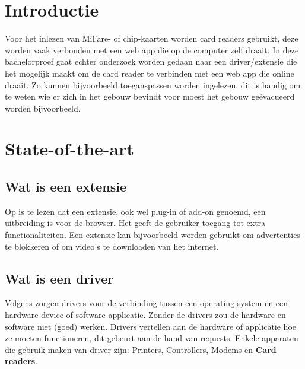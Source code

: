 \documentclass{hogent-article}
\affiliation{
  \textsuperscript{1} \href{mailto:wout.demaeseneer@student.hogent.be}{mailto:wout.demaeseneer@student.hogent.be}}
\begin{document}
\flushbottom %
\maketitle %
\tableofcontents %
\thispagestyle{empty} %


\section{Introductie}
Voor het inlezen van MiFare- of chip-kaarten worden card readers gebruikt, deze worden vaak verbonden met een web app die op de computer zelf draait. In deze bachelorproef gaat echter onderzoek worden gedaan naar een driver/extensie die het mogelijk maakt om de card reader te verbinden met een web app die online draait. Zo kunnen bijvoorbeeld toeganspassen worden ingelezen, dit is handig om te weten wie er zich in het gebouw bevindt voor moest het gebouw geëvacueerd worden bijvoorbeeld.

\section{State-of-the-art}

\subsection{Wat is een extensie}
Op \textcite{Seniorweb} is te lezen dat een extensie, ook wel plug-in of add-on genoemd, een uitbreiding is voor de browser. Het geeft de gebruiker toegang tot extra functionaliteiten. Een extensie kan bijvoorbeeld worden gebruikt om advertenties te blokkeren of om video's te downloaden van het internet.

\subsection{Wat is een driver}
Volgens \textcite{Webopedia} zorgen drivers voor de verbinding tussen een operating system en een hardware device of software applicatie. Zonder de drivers zou de hardware en software niet (goed) werken. Drivers vertellen aan de hardware of applicatie hoe ze moeten functioneren, dit gebeurt aan de hand van requests. Enkele apparaten die gebruik maken van driver zijn: Printers, Controllers, Modems en \textbf{Card readers}.
\end{document}
